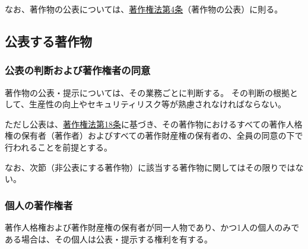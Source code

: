 なお、著作物の公表については、\href{https://elaws.e-gov.go.jp/document?lawid=345AC0000000048\#Mp-At_4}{著作権法第4条}（著作物の公表）\cite{onoline:eGovCopyrightLaw}に則る。


\subsection{公表する著作物}

\subsubsection{公表の判断および著作権者の同意}
著作物の公表・提示については、その業務ごとに判断する。
その判断の根拠として、生産性の向上やセキュリティリスク等が熟慮されなければならない。

ただし公表は、\href{https://elaws.e-gov.go.jp/document?lawid=345AC0000000048\#Mp-At_2}{著作権法第18条}に基づき、その著作物におけるすべての著作人格権の保有者（著作者）およびすべての著作財産権の保有者の、全員の同意の下で行われることを前提とする。

なお、次節（非公表にする著作物）に該当する著作物に関してはその限りではない。

\subsubsection{個人の著作権者\label{subsec:individualholder}}
著作人格権および著作財産権の保有者が同一人物であり、かつ1人の個人のみである場合は、その個人は公表・提示する権利を有する。

